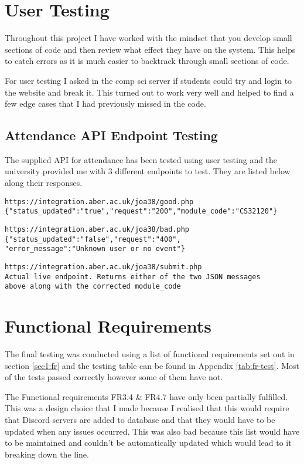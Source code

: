 \section{User Testing}
Throughout this project I have worked with the mindset that you develop small sections of code and then review what effect they have on the system. This helps to catch errors as it is much easier to backtrack through small sections of code.

For user testing I asked in the comp sci server if students could try and login to the website and break it. This turned out to work very well and helped to find a few edge cases that I had previously missed in the code.

\subsection{Attendance API Endpoint Testing}
The supplied API for attendance has been tested using user testing and the university provided me with 3 different endpoints to test. They are listed below along their responses.

\begin{verbatim}
https://integration.aber.ac.uk/joa38/good.php
{"status_updated":"true","request":"200","module_code":"CS32120"}    
\end{verbatim}

\begin{verbatim}
https://integration.aber.ac.uk/joa38/bad.php
{"status_updated":"false","request":"400",
"error_message":"Unknown user or no event"}
\end{verbatim}

\begin{verbatim}
https://integration.aber.ac.uk/joa38/submit.php
Actual live endpoint. Returns either of the two JSON messages 
above along with the corrected module_code
\end{verbatim}

\section{Functional Requirements}\label{sec4:fr}
The final testing was conducted using a list of functional requirements set out in section \ref{sec1:fr} and the testing table can be found in Appendix \ref{tab:fr-test}. Most of the tests passed correctly however some of them have not.

The Functional requirements FR3.4 \& FR4.7 have only been partially fulfilled. This was a design choice that I made because I realised that this would require that Discord servers are added to database and that they would have to be updated when any issues occurred. This was also bad because this list would have to be maintained and couldn't be automatically updated which would lead to it breaking down the line.